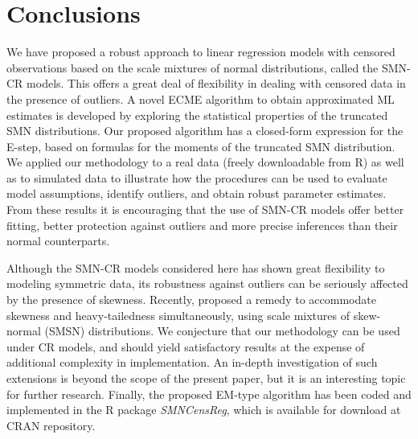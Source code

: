 \section{Conclusions}
We have proposed a robust approach to linear regression models with
censored observations based on the scale mixtures of normal
distributions, called the \textrm{SMN-CR} models. This offers a
great deal of flexibility in dealing with censored data in the
presence of outliers.  A novel ECME algorithm to obtain approximated
ML estimates is developed by exploring the statistical properties of
the truncated SMN distributions. Our proposed algorithm has a
closed-form expression for the E-step, based on formulas for the
moments of the truncated SMN distribution. We applied our
methodology to a real data (freely downloadable from R) as well as
to simulated data to illustrate how the procedures can be used to
evaluate model assumptions, identify outliers, and obtain robust
parameter estimates.  From these results it is encouraging that the
use of \textrm{SMN-CR} models offer better fitting, better
protection against outliers and more precise inferences than their
normal counterparts.

Although the \textrm{SMN-CR} models considered here has shown great
flexibility to modeling symmetric data, its robustness against
outliers can be seriously affected by the presence of skewness.
Recently, \cite{Lachos_Ghosh_Arellano_2009}  proposed a remedy to
accommodate skewness and heavy-tailedness simultaneously, using
scale mixtures of skew-normal (SMSN) distributions. We conjecture
that our methodology can be used under CR models, and should yield
satisfactory results at the expense of additional complexity in
implementation. An in-depth investigation of such extensions is
beyond the scope of the present paper, but it is an interesting
topic for further research. Finally, the proposed EM-type algorithm
has been coded and implemented in the R package \emph{SMNCensReg},
which is available for download at CRAN repository.
